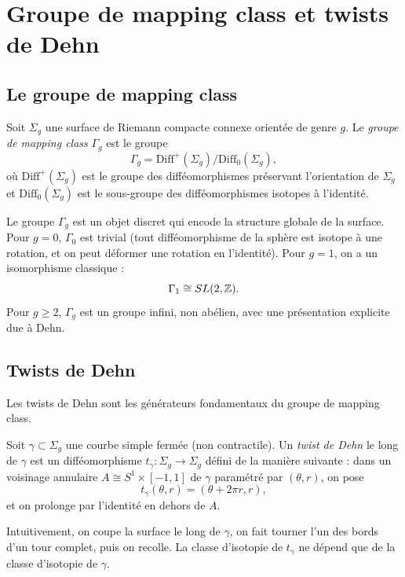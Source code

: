 \section{Groupe de mapping class et twists de Dehn}

\subsection{Le groupe de mapping class}

\begin{definition}
Soit $\Sigma_g$ une surface de Riemann compacte connexe orientée de genre $g$. Le \emph{groupe de mapping class} $\Gamma_g$ est le groupe
\[
\Gamma_g = \mathrm{Diff}^+(\Sigma_g) / \mathrm{Diff}_0(\Sigma_g),
\]
où $\mathrm{Diff}^+(\Sigma_g)$ est le groupe des difféomorphismes préservant l'orientation de $\Sigma_g$ et $\mathrm{Diff}_0(\Sigma_g)$ est le sous-groupe des difféomorphismes isotopes à l'identité.
\end{definition}

Le groupe $\Gamma_g$ est un objet discret qui encode la structure globale de la surface. Pour $g=0$, $\Gamma_0$ est trivial (tout difféomorphisme de la sphère est isotope à une rotation, et on peut déformer une rotation en l'identité). Pour $g=1$, on a un isomorphisme classique :
\[
\Gamma_1 \cong SL(2,\mathbb{Z}).
\]
Pour $g \ge 2$, $\Gamma_g$ est un groupe infini, non abélien, avec une présentation explicite due à Dehn.

\subsection{Twists de Dehn}

Les twists de Dehn sont les générateurs fondamentaux du groupe de mapping class.

\begin{definition}
Soit $\gamma \subset \Sigma_g$ une courbe simple fermée (non contractile). Un \emph{twist de Dehn} le long de $\gamma$ est un difféomorphisme $t_\gamma: \Sigma_g \to \Sigma_g$ défini de la manière suivante : dans un voisinage annulaire $A \cong S^1 \times [-1,1]$ de $\gamma$ paramétré par $(\theta, r)$, on pose
\[
t_\gamma(\theta, r) = (\theta + 2\pi r, r),
\]
et on prolonge par l'identité en dehors de $A$.
\end{definition}

Intuitivement, on coupe la surface le long de $\gamma$, on fait tourner l'un des bords d'un tour complet, puis on recolle. La classe d'isotopie de $t_\gamma$ ne dépend que de la classe d'isotopie de $\gamma$.

